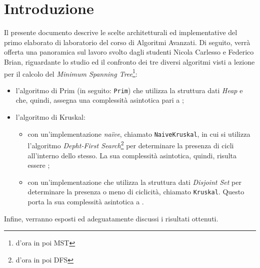 \section{Introduzione}
Il presente documento descrive le scelte architetturali ed implementative del primo elaborato di laboratorio del corso di Algoritmi Avanzati. Di seguito, verrà offerta una panoramica sul lavoro svolto dagli studenti Nicola Carlesso e Federico Brian, riguardante lo studio ed il confronto dei tre diversi algoritmi visti a lezione per il calcolo del \emph{Minimum Spanning Tree}\footnote{d'ora in poi MST}:
\begin{itemize}
	\item l'algoritmo di Prim (in seguito: \texttt{Prim}) che utilizza la struttura dati \emph{Heap} e che, quindi, assegna una complessità asintotica pari a ;
	\item l'algoritmo di Kruskal:
	\begin{itemize}
		\item con un'implementazione \emph{na\"ive}, chiamato \texttt{NaiveKruskal}, in cui si utilizza l'algoritmo \emph{Depht-First Search}\footnote{d'ora in poi DFS} per determinare la presenza di cicli all'interno dello stesso. La sua complessità asintotica, quindi, risulta essere ;
		\item con un'implementazione che utilizza la struttura dati \emph{Disjoint Set} per determinare la presenza o meno di ciclicità, chiamato \texttt{Kruskal}. Questo porta la sua complessità asintotica a .
	\end{itemize}
\end{itemize}
 Infine, verranno esposti ed adeguatamente discussi i risultati ottenuti.
 \newpage
